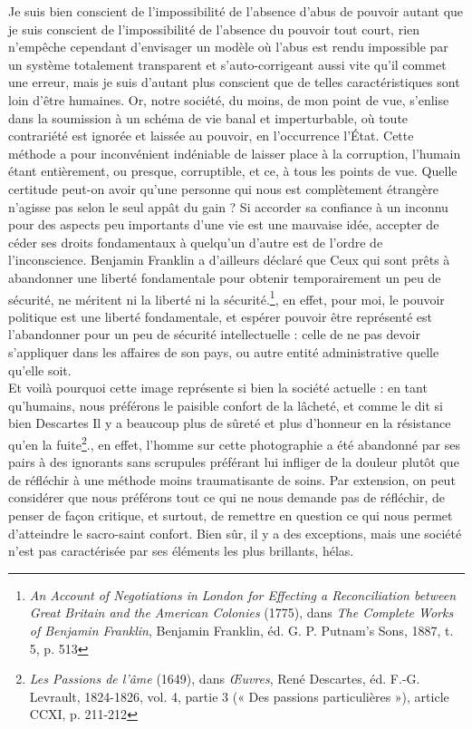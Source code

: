 \documentclass[12pt,a4paper]{article}
\begin{document}
{Je suis bien conscient de l'impossibilité de l'absence d'abus de pouvoir autant que je suis conscient de l'impossibilité de l'absence du pouvoir tout court, rien n'empêche cependant d'envisager un modèle où l'abus est rendu impossible par un système totalement transparent et s'auto-corrigeant aussi vite qu'il commet une erreur, mais je suis d'autant plus conscient que de telles caractéristiques sont loin d'être humaines. Or, notre société, du moins, de mon point de vue, s'enlise dans la soumission à un schéma de vie banal et imperturbable, où toute contrariété est ignorée et laissée au pouvoir, en l'occurrence l'État. Cette méthode a pour inconvénient indéniable de laisser place à la corruption, l'humain étant entièrement, ou presque, corruptible, et ce, à tous les points de vue. Quelle certitude peut-on avoir qu'une personne qui nous est complètement étrangère n'agisse pas selon le seul appât du gain ? Si accorder sa confiance à un inconnu pour des aspects peu importants d'une vie est une mauvaise idée, accepter de céder ses droits fondamentaux à quelqu'un d'autre est de l'ordre de l'inconscience. Benjamin Franklin a d'ailleurs déclaré que \og{}Ceux qui sont prêts à abandonner une liberté fondamentale pour obtenir temporairement un peu de sécurité, ne méritent ni la liberté ni la sécurité.\footnote{\emph{An Account of Negotiations in London for Effecting a Reconciliation between Great Britain and the American Colonies} (1775), dans \emph{The Complete Works of Benjamin Franklin}, Benjamin Franklin, éd. G. P. Putnam’s Sons, 1887, t. 5, p. 513}\fg{}, en effet, pour moi, le pouvoir politique est une liberté fondamentale, et espérer pouvoir être représenté est l'abandonner pour un peu de sécurité intellectuelle : celle de ne pas devoir s'appliquer dans les affaires de son pays, ou autre entité administrative quelle qu'elle soit. \\

Et voilà pourquoi cette image représente si bien la société actuelle : en tant qu'humains, nous préférons le paisible confort de la lâcheté, et comme le dit si bien Descartes \og{}Il y a beaucoup plus de sûreté et plus d'honneur en la résistance qu'en la fuite\footnote{\emph{Les Passions de l'âme} (1649), dans \emph{Œuvres}, René Descartes, éd. F.-G. Levrault, 1824-1826, vol. 4, partie 3 (« Des passions particulières »), article CCXI, p. 211-212}.\fg{}, en effet, l'homme sur cette photographie a été abandonné par ses pairs à des ignorants sans scrupules préférant lui infliger de la douleur plutôt que de réfléchir à une méthode moins traumatisante de soins. Par extension, on peut considérer que nous préférons tout ce qui ne nous demande pas de réfléchir, de penser de façon critique, et surtout, de remettre en question ce qui nous permet d'atteindre le sacro-saint confort. Bien sûr, il y a des exceptions, mais une société n'est pas caractérisée par ses éléments les plus brillants, hélas.\\

}
\end{document}
